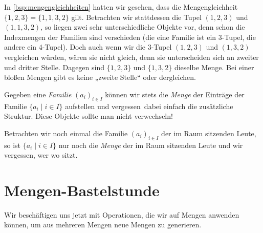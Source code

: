 \begin{bsp}
	In \cref{bsp:mengengleichheiten} hatten wir gesehen, dass die Mengengleichheit $\{1,2,3\}=\{1,1,3,2\}$ gilt. Betrachten wir stattdessen die Tupel $(1,2,3)$ und $(1,1,3,2)$, so liegen zwei sehr unterschiedliche Objekte vor, denn schon die Indexmengen der Familien sind verschieden (die eine Familie ist ein 3-Tupel, die andere ein 4-Tupel). Doch auch wenn wir die 3-Tupel $(1,2,3)$ und $(1,3,2)$ vergleichen würden, wären sie nicht gleich, denn sie unterscheiden sich an zweiter und dritter Stelle. Dagegen sind $\{1,2,3\}$ und $\{1,3,2\}$ dieselbe Menge. Bei einer bloßen Mengen gibt es keine „zweite Stelle“ oder dergleichen.
\end{bsp}

\begin{bem} \label{mengeeinerfamilie}
	Gegeben eine \textit{Familie} $(a_i)_{i\in I}$ können wir stets die \textit{Menge} der Einträge der Familie $\{a_i\mid i\in I\}$ aufstellen und \glqq vergessen\grqq\, dabei einfach die zusätzliche Struktur. Diese Objekte sollte man nicht verwechseln!
	
	Betrachten wir noch einmal die Familie $(a_i)_{i\in I}$ der im Raum sitzenden Leute, so ist $\{a_i\mid i\in I\}$ nur noch die \textit{Menge} der im Raum sitzenden Leute und wir vergessen, wer wo sitzt.
\end{bem}



\section{Mengen-Bastelstunde}
Wir beschäftigen uns jetzt mit Operationen, die wir auf Mengen anwenden können, um aus mehreren Mengen neue Mengen zu generieren.

